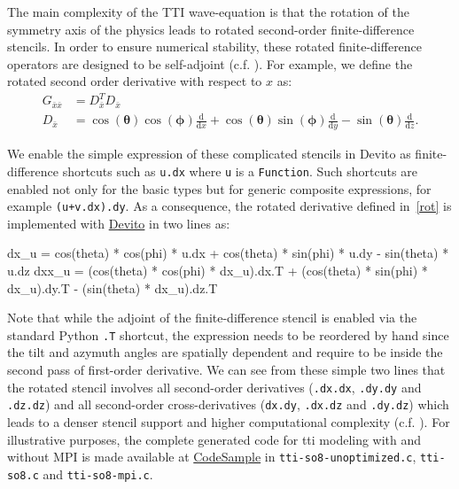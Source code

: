 \documentclass[conference]{IEEEtran}
\begin{document}
The main complexity of the TTI wave-equation is that the rotation of the
symmetry axis of the physics leads to rotated second-order finite-difference
stencils. In order to ensure numerical stability, these rotated
finite-difference operators are designed to be self-adjoint (c.f.
\cite{zhang2011, duveneck}). For example, we define the rotated second order
derivative with respect to $x$ as:
%
\begin{equation}
\begin{aligned}
  G_{\bar{x}\bar{x}} &= D_{\bar{x}}^T D_{\bar{x}} \\
  D_{\bar{x}} &= \cos(\mathbf{\theta})\cos(\mathbf{\phi})\frac{\mathrm{d}}{\mathrm{d}x} + \cos(\mathbf{\theta})\sin(\mathbf{\phi})\frac{\mathrm{d}}{\mathrm{d}y} - \sin(\mathbf{\theta})\frac{\mathrm{d}}{\mathrm{d}z}.
\end{aligned}
\label{rot}
\end{equation}
%

We enable the simple expression of these complicated stencils in Devito
as finite-difference shortcuts such as \texttt{u.dx} where \texttt{u} is
a \texttt{Function}. Such shortcuts are enabled not only for the basic
types but for generic composite expressions, for example
\texttt{(u\phantom{\ }+\phantom{\ }v.dx).dy}. As a consequence, the
rotated derivative defined in~\ref{rot} is implemented with \href{https://github.com/devitocodes/devito}{Devito} in two
lines as:

\begin{python}
dx_u = cos(theta) * cos(phi) * u.dx +
       cos(theta) * sin(phi) * u.dy -
       sin(theta) * u.dz
dxx_u = (cos(theta) * cos(phi) * dx_u).dx.T +
        (cos(theta) * sin(phi) * dx_u).dy.T -
        (sin(theta) * dx_u).dz.T
\end{python}

Note that while the adjoint of the finite-difference stencil is enabled via the
standard Python \texttt{.T} shortcut, the expression needs to be reordered by hand
since the tilt and azymuth angles are spatially dependent and require to be
inside the second pass of first-order derivative. We can see from these simple
two lines that the rotated stencil involves all second-order derivatives
(\texttt{.dx.dx}, \texttt{.dy.dy} and \texttt{.dz.dz}) and all second-order
cross-derivatives (\texttt{dx.dy}, \texttt{.dx.dz} and \texttt{.dy.dz}) which
leads to a denser stencil support and higher computational complexity
(c.f. \cite{louboutin2016ppf}). For illustrative purposes, the complete
generated code for tti modeling with and without MPI is made available
at \href{https://github.com/mloubout/SC20Paper/tree/master/codesamples}{CodeSample}
in \texttt{tti-so8-unoptimized.c}, \texttt{tti-so8.c} and \texttt{tti-so8-mpi.c}.
\end{document}

